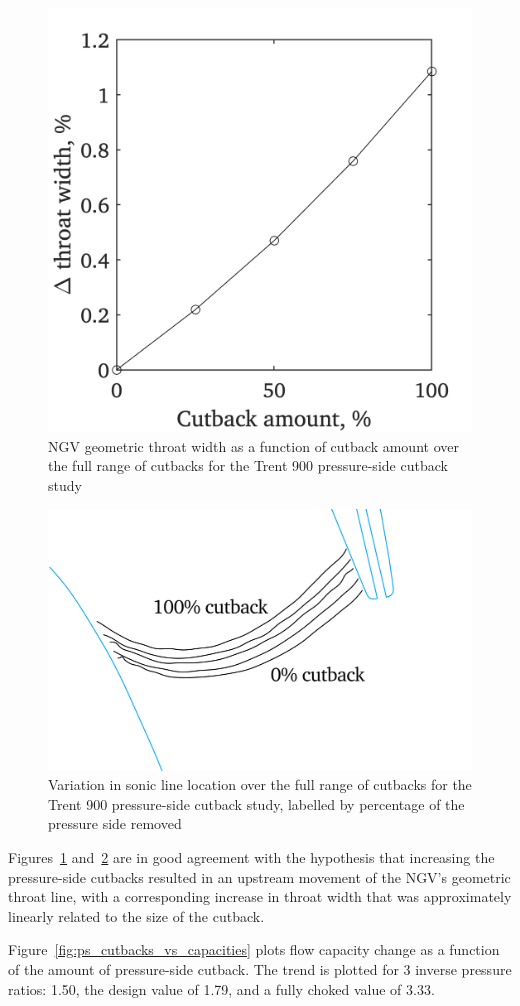 \documentclass[a4paper, 11pt, oneside]{report}
\begin{document}
\begin{figure}[H]
	\centering
	\includegraphics[width=.45\textwidth]{figs/ps_cutbacks_vs_throat_widths.png}
	\caption{NGV geometric throat width as a function of cutback amount over the full range of cutbacks for the Trent 900 pressure-side cutback study}
    \label{fig:ps_cutbacks_vs_throat_widths}
\end{figure}

\begin{figure}[H]
	\centering
	\includegraphics[width=.7\textwidth]{figs/ps_cutbacks_m1_lines_illustration.png}
	\caption{Variation in sonic line location over the full range of cutbacks for the Trent 900 pressure-side cutback study, labelled by percentage of the pressure side removed}
    \label{fig:ps_cutbacks_m1_lines_illustration}
\end{figure}

Figures~\ref{fig:ps_cutbacks_vs_throat_widths} and~\ref{fig:ps_cutbacks_m1_lines_illustration} are in good agreement with the hypothesis that increasing the pressure-side cutbacks resulted in an upstream movement of the NGV's geometric throat line, with a corresponding increase in throat width that was approximately linearly related to the size of the cutback.

Figure~\ref{fig:ps_cutbacks_vs_capacities} plots flow capacity change as a function of the amount of pressure-side cutback. The trend is plotted for 3 inverse pressure ratios: 1.50, the design value of 1.79, and a fully choked value of 3.33.
\end{document}
